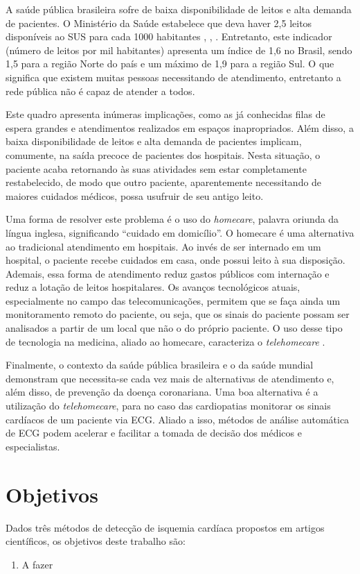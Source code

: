 A saúde pública brasileira sofre de baixa disponibilidade de leitos e alta demanda de pacientes. O Ministério da Saúde estabelece que deva haver 2,5 leitos disponíveis ao SUS para cada 1000 habitantes \cite{IBGE2009}, \cite{IBGE2009}, \cite{Brasil2002}. Entretanto, este indicador (número de leitos por mil habitantes) apresenta um índice de 1,6 no Brasil, sendo 1,5 para a região Norte do país e um máximo de 1,9 para a região Sul. O que significa que existem muitas pessoas necessitando de atendimento, entretanto a rede pública não é capaz de atender a todos.

Este quadro apresenta inúmeras implicações, como as já conhecidas filas de espera grandes e atendimentos realizados em espaços inapropriados. Além disso, a baixa disponibilidade de leitos e alta demanda de pacientes implicam, comumente, na saída precoce de pacientes dos hospitais. Nesta situação, o paciente acaba retornando às suas atividades sem estar completamente restabelecido, de modo que outro paciente, aparentemente necessitando de maiores cuidados médicos, possa usufruir de seu antigo leito.

Uma forma de resolver este problema é o uso do \emph{homecare}, palavra oriunda da língua inglesa, significando ``cuidado em domicílio''. O homecare é uma alternativa ao tradicional atendimento em hospitais. Ao invés de ser internado em um hospital, o paciente recebe cuidados em casa, onde possui leito à sua disposição. Ademais, essa forma de atendimento reduz gastos públicos com internação e reduz a lotação de leitos hospitalares. Os avanços tecnológicos atuais, especialmente no campo das telecomunicações, permitem que se faça ainda um monitoramento remoto do paciente, ou seja, que os sinais do paciente possam ser analisados a partir de um local que não o do próprio paciente. O uso desse tipo de tecnologia na medicina, aliado ao homecare, caracteriza o \emph{telehomecare} \cite{Augustyniak2009}.

Finalmente, o contexto da saúde pública brasileira e o da saúde mundial demonstram que necessita-se cada vez mais de alternativas de atendimento e, além disso, de prevenção da doença coronariana. Uma boa alternativa é a utilização do \emph{telehomecare}, para no caso das cardiopatias monitorar os sinais cardíacos de um paciente via ECG. Aliado a isso, métodos de análise automática de ECG podem acelerar e facilitar a tomada de decisão dos médicos e especialistas.


\section{Objetivos}
Dados três métodos de detecção de isquemia cardíaca propostos em artigos científicos, os objetivos deste trabalho são:
\begin{enumerate}
    \item A fazer
\end{enumerate}


